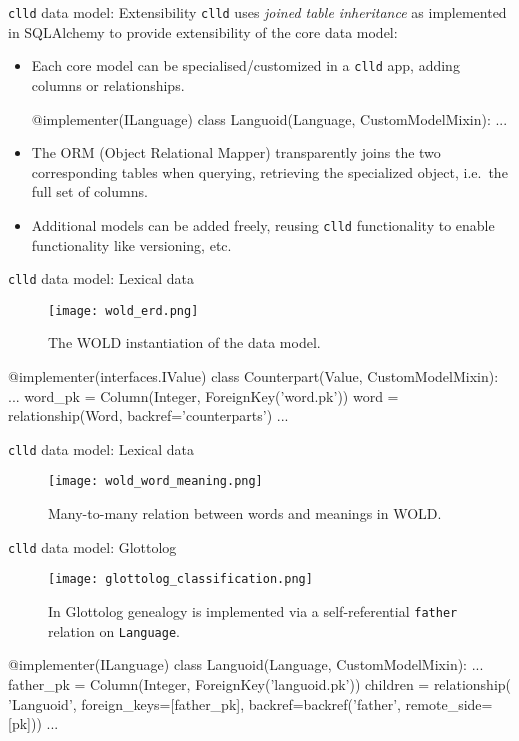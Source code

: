 \documentclass{beamer}
\begin{document}
\begin{frame}[fragile]{\texttt{clld} data model: Extensibility}
\texttt{clld} uses \textit{joined table inheritance} as implemented in
SQLAlchemy to provide extensibility of the core data model:
\begin{itemize}
\item Each core model can be specialised/customized in a \texttt{clld} app,
adding columns or relationships.
\begin{python}
@implementer(ILanguage)
class Languoid(Language, CustomModelMixin):
    ...
\end{python}
\item The ORM (Object Relational Mapper) transparently joins the two
corresponding tables when querying, retrieving the specialized object,
i.e.~the full set of columns.
\item Additional models can be added freely, reusing \texttt{clld} functionality
to enable functionality like versioning, etc.
\end{itemize}
\end{frame}


\begin{frame}[fragile]{\texttt{clld} data model: Lexical data}
\begin{figure}
\texttt{[image: wold\_erd.png]}
\caption{\label{fig:wold}The WOLD instantiation of the data model.}
\end{figure}
\begin{python}
@implementer(interfaces.IValue)
class Counterpart(Value, CustomModelMixin):
    ...
    word_pk = Column(Integer, ForeignKey('word.pk'))
    word = relationship(Word, backref='counterparts')
    ...
\end{python}
\end{frame}


\begin{frame}{\texttt{clld} data model: Lexical data}
\begin{figure}
\texttt{[image: wold\_word\_meaning.png]}
\caption{\label{fig:wals1}Many-to-many relation between words and meanings in WOLD.}
\end{figure}
\end{frame}



\begin{frame}[fragile]{\texttt{clld} data model: Glottolog}
\begin{figure}
\texttt{[image: glottolog\_classification.png]}
\caption{\label{fig:wals1}In Glottolog genealogy is implemented
via a self-referential \texttt{father} relation on \texttt{Language}.}
\end{figure}
\begin{python}
@implementer(ILanguage)
class Languoid(Language, CustomModelMixin):
    ...
    father_pk = Column(Integer, ForeignKey('languoid.pk'))
    children = relationship(
        'Languoid',
        foreign_keys=[father_pk],
        backref=backref('father', remote_side=[pk]))
    ...
\end{python}
\end{frame}
\end{document}

